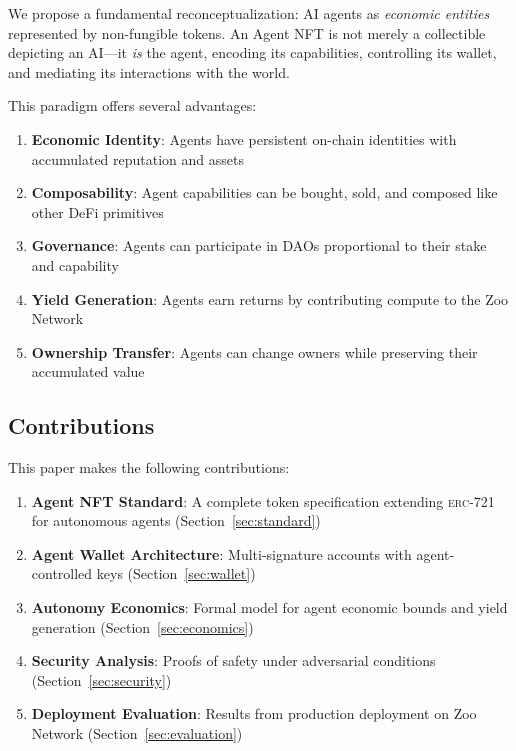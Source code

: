 \documentclass[11pt,letterpaper]{article}
\newcommand{\ERC}{\textsc{erc}}
\begin{document}
We propose a fundamental reconceptualization: AI agents as \emph{economic entities} represented by non-fungible tokens. An Agent NFT is not merely a collectible depicting an AI---it \emph{is} the agent, encoding its capabilities, controlling its wallet, and mediating its interactions with the world.

This paradigm offers several advantages:

\begin{enumerate}
    \item \textbf{Economic Identity}: Agents have persistent on-chain identities with accumulated reputation and assets

    \item \textbf{Composability}: Agent capabilities can be bought, sold, and composed like other DeFi primitives

    \item \textbf{Governance}: Agents can participate in DAOs proportional to their stake and capability

    \item \textbf{Yield Generation}: Agents earn returns by contributing compute to the Zoo Network

    \item \textbf{Ownership Transfer}: Agents can change owners while preserving their accumulated value
\end{enumerate}

\subsection{Contributions}

This paper makes the following contributions:

\begin{enumerate}
    \item \textbf{Agent NFT Standard}: A complete token specification extending \ERC{}-721 for autonomous agents (Section~\ref{sec:standard})

    \item \textbf{Agent Wallet Architecture}: Multi-signature accounts with agent-controlled keys (Section~\ref{sec:wallet})

    \item \textbf{Autonomy Economics}: Formal model for agent economic bounds and yield generation (Section~\ref{sec:economics})

    \item \textbf{Security Analysis}: Proofs of safety under adversarial conditions (Section~\ref{sec:security})

    \item \textbf{Deployment Evaluation}: Results from production deployment on Zoo Network (Section~\ref{sec:evaluation})
\end{enumerate}
\end{document}

